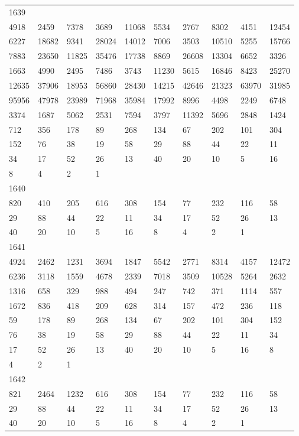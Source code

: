 \begin{longtable}{*{10}{l}}
1639&&&&&&&&&\\
4918& 2459& 7378& 3689& 11068& 5534& 2767& 8302& 4151& 12454\\
6227& 18682& 9341& 28024& 14012& 7006& 3503& 10510& 5255& 15766\\
7883& 23650& 11825& 35476& 17738& 8869& 26608& 13304& 6652& 3326\\
1663& 4990& 2495& 7486& 3743& 11230& 5615& 16846& 8423& 25270\\
12635& 37906& 18953& 56860& 28430& 14215& 42646& 21323& 63970& 31985\\
95956& 47978& 23989& 71968& 35984& 17992& 8996& 4498& 2249& 6748\\
3374& 1687& 5062& 2531& 7594& 3797& 11392& 5696& 2848& 1424\\
712& 356& 178& 89& 268& 134& 67& 202& 101& 304\\
152& 76& 38& 19& 58& 29& 88& 44& 22& 11\\
34& 17& 52& 26& 13& 40& 20& 10& 5& 16\\
8& 4& 2& 1& \\

1640&&&&&&&&&\\
820& 410& 205& 616& 308& 154& 77& 232& 116& 58\\
29& 88& 44& 22& 11& 34& 17& 52& 26& 13\\
40& 20& 10& 5& 16& 8& 4& 2& 1& \\

1641&&&&&&&&&\\
4924& 2462& 1231& 3694& 1847& 5542& 2771& 8314& 4157& 12472\\
6236& 3118& 1559& 4678& 2339& 7018& 3509& 10528& 5264& 2632\\
1316& 658& 329& 988& 494& 247& 742& 371& 1114& 557\\
1672& 836& 418& 209& 628& 314& 157& 472& 236& 118\\
59& 178& 89& 268& 134& 67& 202& 101& 304& 152\\
76& 38& 19& 58& 29& 88& 44& 22& 11& 34\\
17& 52& 26& 13& 40& 20& 10& 5& 16& 8\\
4& 2& 1& \\

1642&&&&&&&&&\\
821& 2464& 1232& 616& 308& 154& 77& 232& 116& 58\\
29& 88& 44& 22& 11& 34& 17& 52& 26& 13\\
40& 20& 10& 5& 16& 8& 4& 2& 1& \\


\end{longtable}
